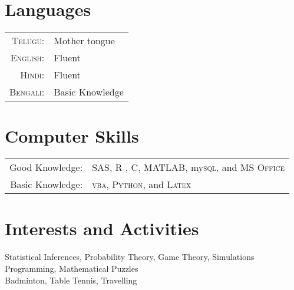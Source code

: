 \documentclass[a4paper,10pt]{article}
\begin{document}
\section{Languages}
\begin{tabular}{rl}
 \textsc{Telugu:}&Mother tongue\\
\textsc{English:}&Fluent\\
\textsc{Hindi:}&Fluent\\
\textsc{Bengali:}&Basic Knowledge \\
\end{tabular}

\section{Computer Skills}
\begin{tabular}{rl}
 Good Knowledge:& \textsc{SAS}, \textsc{R} , \textsc{C},  \textsc{MATLAB}, my\textsc{sql}, and \textsc{MS Office} \setmainfont[SmallCapsFont=Fontin-SmallCaps.otf]{Fontin.otf}\\

Basic Knowledge:& \textsc{vba}, \textsc{Python}, and \textsc{Latex}\\
\end{tabular}

\section{Interests and Activities}
Statistical Inferences, Probability Theory, Game Theory, Simulations\\
Programming, Mathematical Puzzles\\
Badminton, Table Tennis, Travelling




\end{document}

